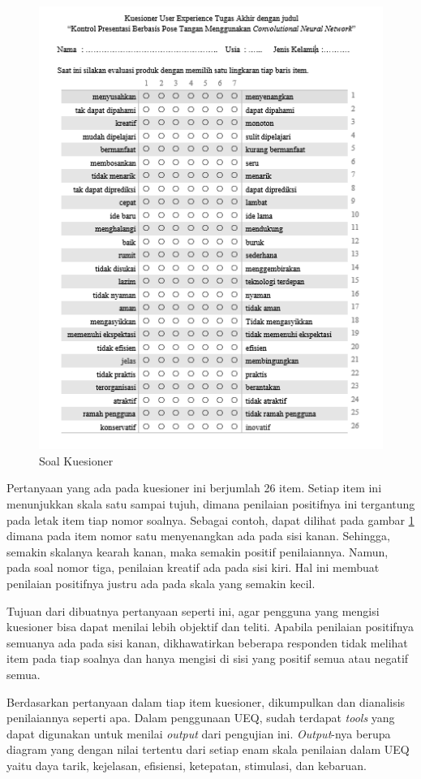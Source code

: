 \begin{figure}[!htb]
  \centering
  \includegraphics[scale=1.4]{gambar/pengujian-user-experience/soal-kuesioner.png}
  \caption{Soal Kuesioner}
  \label{fig:Soal Kuesioner}
\end{figure}

Pertanyaan yang ada pada kuesioner ini berjumlah 26 item. Setiap item ini menunjukkan skala satu sampai tujuh, dimana penilaian positifnya ini tergantung pada letak item tiap nomor soalnya. Sebagai contoh, dapat dilihat pada gambar \ref{fig:Soal Kuesioner} dimana pada item nomor satu menyenangkan ada pada sisi kanan. Sehingga, semakin skalanya kearah kanan, maka semakin positif penilaiannya. Namun, pada soal nomor tiga, penilaian kreatif ada pada sisi kiri. Hal ini membuat penilaian positifnya justru ada pada skala yang semakin kecil. 

Tujuan dari dibuatnya pertanyaan seperti ini, agar pengguna yang mengisi kuesioner bisa dapat menilai lebih objektif dan teliti. Apabila penilaian positifnya semuanya ada pada sisi kanan, dikhawatirkan beberapa responden tidak melihat item pada tiap soalnya dan hanya mengisi di sisi yang positif semua atau negatif semua.  

Berdasarkan pertanyaan dalam tiap item kuesioner, dikumpulkan dan dianalisis penilaiannya seperti apa. Dalam penggunaan UEQ, sudah terdapat \emph{tools} yang dapat digunakan untuk menilai \emph{output} dari pengujian ini. \emph{Output}-nya berupa diagram yang dengan nilai tertentu dari setiap enam skala penilaian dalam UEQ yaitu daya tarik, kejelasan, efisiensi, ketepatan, stimulasi, dan kebaruan.